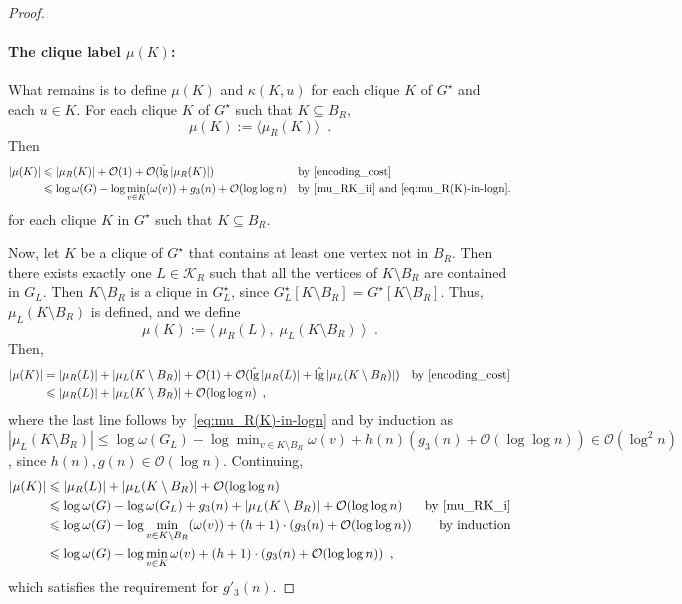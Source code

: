 \documentclass{patmorin}
\let\eqref\cref
\renewcommand{\le}{\leqslant}
\renewcommand{\leq}{\leqslant}
\DeclareMathOperator{\lgg}{\hat{lg}}
\newcommand{\Oh}{\mathcal{O}}
\begin{document}
\begin{proof}
    \paragraph{\boldmath The clique label $\mu(K)$:}
    What remains is to define $\mu(K)$ and $\kappa(K,u)$ for each clique $K$ of $G^\star$ and each $u\in K$.  For each clique $K$ of $G^\star$ such that $K\subseteq B_R$,
    \[
       \mu(K) := \langle \mu_R(K)\rangle \enspace .
    \]
    Then
    \begin{align*}
    |\mu(K)| &\leq |\mu_R(K)| + \Oh(1) + \Oh(\lgg|\mu_R(K)|)&&\text{by~\eqref{encoding_cost}}\\
    &\leq \log\omega(G) - \log\min_{v\in K}(\omega(v)) + g_3(n) + \Oh(\log\log n)&&\textrm{by~\eqref{mu_RK_ii} and~\eqref{eq:mu_R(K)-in-logn}.}
    \end{align*}
    for each clique $K$ in $G^\star$ such that $K\subseteq B_R$.

    Now, let $K$ be a clique of $G^\star$ that contains at least one vertex not in $B_R$. Then there exists exactly one $L\in\mathcal{K}_R$ such that all the vertices of $K\setminus B_R$ are contained in $G_L$. Then $K\setminus B_R$ is a clique in $G^\star_L$, since $G^\star_L[K\setminus B_R]=G^\star[K\setminus B_R]$. Thus, $\mu_L(K\setminus B_R)$ is defined, and we define
    \[
        \mu(K):= \langle\;\mu_R(L),\;\mu_{L}(K\setminus B_R)\;\rangle
        \enspace .
    \]
    Then,
    \begin{align*}
     |\mu(K)|
       & = |\mu_R(L)| + |\mu_{L}(K\setminus B_R)| + \Oh(1)+\Oh(\lgg|\mu_R(L)|+\lgg|\mu_L(K\setminus B_R)|)
       & \text{by \eqref{encoding_cost}} \\
       & \le |\mu_R(L)| + |\mu_{L}(K\setminus B_R)| + \Oh(\log\log n)\enspace,
       \end{align*}
       where the last line follows by~\eqref{eq:mu_R(K)-in-logn} and by induction as $|\mu_L(K\setminus B_R)|\leq \log\omega(G_L)-\log\min_{v\in K\setminus B_R}\omega(v) + h(n)(g_3(n)+\Oh(\log\log n)) \in\Oh(\log^2 n)$, since $h(n),g(n)\in\Oh(\log n)$. Continuing,
       \begin{align*}
       |\mu(K)| & \le |\mu_R(L)| + |\mu_{L}(K\setminus B_R)| + \Oh(\log\log n) \\
       & \le \log\omega(G)-\log \omega(G_{L}) + g_3(n) + |\mu_{L}(K\setminus B_R)| + \Oh(\log\log n)
       & \text{by \eqref{mu_RK_i}}\\
       & \le \log\omega(G) - \log\min_{v\in K\setminus B_R}(\omega(v)) + (h+1)\cdot (g_3(n) +  \Oh(\log\log n))
       & \text{by induction} \\
       & \le \log\omega(G) - \log\min_{v\in K}\omega(v) + (h+1)\cdot (g_3(n) + \Oh(\log\log n)) \enspace ,
    \end{align*}
    which satisfies the requirement for $g'_3(n)$.


\end{proof}
\end{document}
